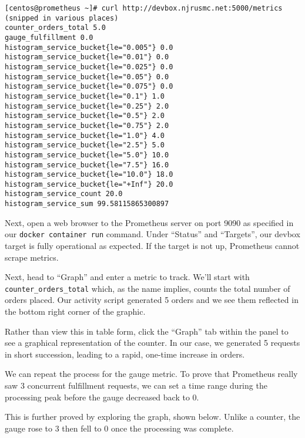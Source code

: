 \begin{verbatim}
[centos@prometheus ~]# curl http://devbox.njrusmc.net:5000/metrics
(snipped in various places)
counter_orders_total 5.0
gauge_fulfillment 0.0
histogram_service_bucket{le="0.005"} 0.0
histogram_service_bucket{le="0.01"} 0.0
histogram_service_bucket{le="0.025"} 0.0
histogram_service_bucket{le="0.05"} 0.0
histogram_service_bucket{le="0.075"} 0.0
histogram_service_bucket{le="0.1"} 1.0
histogram_service_bucket{le="0.25"} 2.0
histogram_service_bucket{le="0.5"} 2.0
histogram_service_bucket{le="0.75"} 2.0
histogram_service_bucket{le="1.0"} 4.0
histogram_service_bucket{le="2.5"} 5.0
histogram_service_bucket{le="5.0"} 10.0
histogram_service_bucket{le="7.5"} 16.0
histogram_service_bucket{le="10.0"} 18.0
histogram_service_bucket{le="+Inf"} 20.0
histogram_service_count 20.0
histogram_service_sum 99.58115865300897
\end{verbatim}

Next, open a web browser to the Prometheus server on port 9090 as specified
in our \verb|docker container run| command. Under ``Status'' and ``Targets'',
our devbox target is fully operational as expected. If the target is not up,
Prometheus cannot scrape metrics.


Next, head to ``Graph'' and enter a metric to track. We'll start with
\verb|counter_orders_total| which, as the name implies, counts the
total number of orders placed. Our activity script generated 5 orders
and we see them reflected in the bottom right corner of the graphic.


Rather than view this in table form, click the ``Graph'' tab within
the panel to see a graphical representation of the counter. In our case,
we generated 5 requests in short succession, leading to a rapid, one-time
increase in orders.


We can repeat the process for the gauge metric. To prove that Prometheus
really saw 3 concurrent fulfillment requests, we can set a time range during
the processing peak before the gauge decreased back to 0.


This is further proved by exploring the graph, shown below. Unlike a counter,
the gauge rose to 3 then fell to 0 once the processing was complete.

